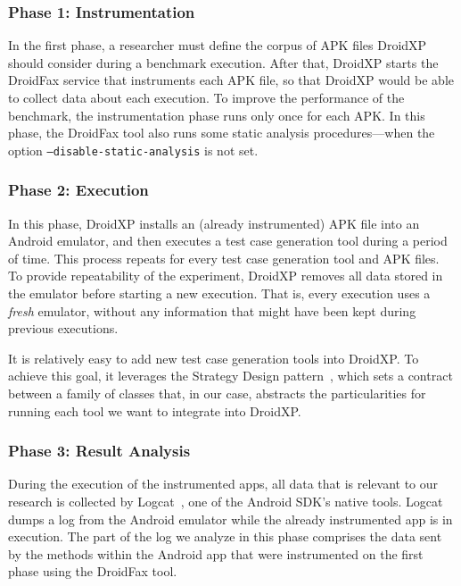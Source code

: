 \subsubsection{Phase 1: Instrumentation}

In the first phase, a researcher must define the corpus of APK files DroidXP should consider during a benchmark execution. After that, DroidXP starts the DroidFax service that instruments each APK file, so that DroidXP would be able to collect data about each execution. To improve the performance of the benchmark, the instrumentation phase runs only once for each APK. In this phase, the DroidFax tool also runs some static analysis procedures---when the option \texttt{--disable-static-analysis} is not set.

\subsubsection{Phase 2: Execution}

In this phase, DroidXP installs an (already instrumented) APK file into
an Android emulator, and then executes a test case generation tool
during a period of time. This process repeats for every test case generation
tool and APK files. To provide repeatability of the experiment, DroidXP removes all data stored in the emulator before starting
a new execution. That is, every execution uses a \emph{fresh} emulator,
without any information that might have been kept during
previous executions. 

It is relatively easy to add new test
case generation tools into DroidXP. To achieve this goal, it leverages the Strategy Design
pattern~\cite{patterns-book}, which sets a contract between a family of classes that, in our case, abstracts the particularities
for running each tool we want to integrate into DroidXP.

\subsubsection{Phase 3: Result Analysis}

During the execution of the instrumented apps, all data that is relevant to our
research is collected by Logcat~\cite{Logcat}, one of the Android SDK's native tools. Logcat dumps a log from the Android emulator
while the already instrumented app is in execution. The part of the log we analyze in this phase comprises
the data sent by the methods within the Android app that were instrumented on the first
phase using the DroidFax tool. 

